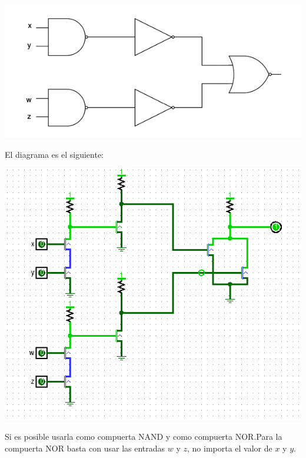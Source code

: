 \documentclass[answers]{exam}
\begin{document}
\begin{questions}
  \begin{center}
    \includegraphics[scale=0.5]{circuito}
  \end{center}
  \begin{solution}
    El diagrama es el siguiente:
    \begin{center}
      \includegraphics[scale=0.8]{ejercicio3}
    \end{center}
  \end{solution}

  \begin{solution}
    Si es posible usarla como compuerta NAND y como compuerta NOR.\@ Para la
    compuerta NOR basta con usar las entradas $w$ y $z$, no importa el valor de
    $x$ y $y$.


\end{solution}
\end{questions}
\end{document}
